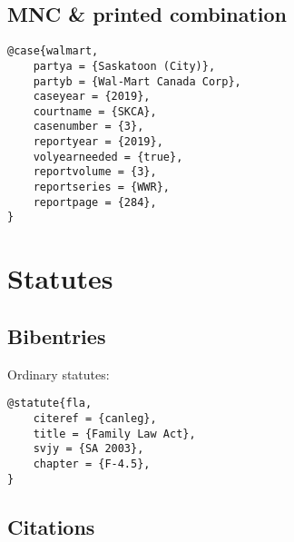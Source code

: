 \par\bigskip
{}\par\bigskip
{}\par\bigskip

\subsection{MNC \& printed combination}
\begin{verbatim}
@case{walmart,
	partya = {Saskatoon (City)},
	partyb = {Wal-Mart Canada Corp},
	caseyear = {2019},
	courtname = {SKCA},
	casenumber = {3},
	reportyear = {2019},
	volyearneeded = {true},
	reportvolume = {3},
	reportseries = {WWR},
	reportpage = {284},
}

\end{verbatim}

%
%
%
%
%
%
%
%
%




\section{Statutes}
\subsection{Bibentries}

Ordinary statutes: \par\bigskip
\begin{verbatim}
@statute{fla,
	citeref = {canleg},
	title = {Family Law Act},
	svjy = {SA 2003},
	chapter = {F-4.5},
}
\end{verbatim}

\subsection{Citations}

